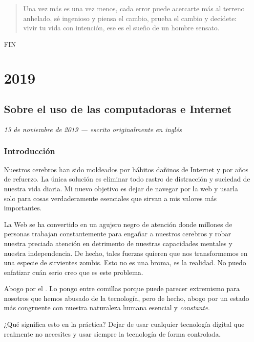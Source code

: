 \documentclass[12pt]{article}
\begin{document}
	\blockquote[]
	{Una vez más es una vez menos, cada error puede acercarte más al
	terreno anhelado, sé ingenioso y piensa el cambio, prueba el cambio y
	decídete: vivir tu vida con intención, ese es el sueño de un hombre
	sensato.}

	\begin{center}FIN\end{center}

	\newpage

	\section{2019}

	\subsection{Sobre el uso de las computadoras e Internet}

	\textit{13 de noviembre de 2019 --- escrito originalmente en inglés}

	\subsubsection*{Introducción}

	Nuestros cerebros han sido moldeados por hábitos dañinos de Internet y
	por años de refuerzo. La única solución es eliminar todo rastro de
	distracción y suciedad de nuestra vida diaria. Mi nuevo objetivo es
	dejar de navegar por la web y usarla solo para cosas verdaderamente
	esenciales que sirvan a mis valores más importantes.

	La Web se ha convertido en un agujero negro de atención donde millones
	de personas trabajan constantemente para engañar a nuestros cerebros y
	robar nuestra preciada atención en detrimento de nuestras capacidades
	mentales y nuestra independencia. De hecho, tales fuerzas quieren que
	nos transformemos en una especie de sirvientes zombis. Esto no es una
	broma, es la realidad. No puedo enfatizar cuán serio creo que es este
	problema.

	Abogo por el . Lo pongo entre comillas porque
	puede parecer extremismo para nosotros que hemos abusado de la
	tecnología, pero de hecho, abogo por un estado más congruente con
	nuestra naturaleza humana esencial y \textit{constante}.

	¿Qué significa esto en la práctica? Dejar de usar cualquier tecnología
	digital que realmente no necesites y usar siempre la tecnología de forma
	controlada.
\end{document}
